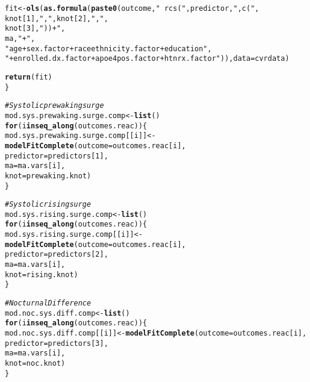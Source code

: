 \documentclass[10pt]{article}\usepackage[]{graphicx}\usepackage[]{color}
\makeatletter
\newcommand{\hlnum}[1]{\textcolor[rgb]{0.686,0.059,0.569}{#1}}%
\newcommand{\hlstr}[1]{\textcolor[rgb]{0.192,0.494,0.8}{#1}}%
\newcommand{\hlcom}[1]{\textcolor[rgb]{0.678,0.584,0.686}{\textit{#1}}}%
\newcommand{\hlstd}[1]{\textcolor[rgb]{0.345,0.345,0.345}{#1}}%
\newcommand{\hlkwa}[1]{\textcolor[rgb]{0.161,0.373,0.58}{\textbf{#1}}}%
\newcommand{\hlkwb}[1]{\textcolor[rgb]{0.69,0.353,0.396}{#1}}%
\newcommand{\hlkwc}[1]{\textcolor[rgb]{0.333,0.667,0.333}{#1}}%
\newcommand{\hlkwd}[1]{\textcolor[rgb]{0.737,0.353,0.396}{\textbf{#1}}}%
\newenvironment{kframe}{%
 \def\at@end@of@kframe{}%
 \ifinner\ifhmode%
  \def\at@end@of@kframe{\end{minipage}}%
  \begin{minipage}{\columnwidth}%
 \fi\fi%
 \def\FrameCommand##1{\hskip\@totalleftmargin \hskip-\fboxsep
 \colorbox{shadecolor}{##1}\hskip-\fboxsep
     \hskip-\linewidth \hskip-\@totalleftmargin \hskip\columnwidth}%
 \MakeFramed {\advance\hsize-\width
   \@totalleftmargin\z@ \linewidth\hsize
   \@setminipage}}%
 {\par\unskip\endMakeFramed%
 \at@end@of@kframe}
\newenvironment{knitrout}{}{} %
\makeatother
\begin{document}
\begin{knitrout}
\begin{kframe}
\begin{alltt}
  \hlstd{fit} \hlkwb{<-} \hlkwd{ols}\hlstd{(}\hlkwd{as.formula}\hlstd{(}\hlkwd{paste0}\hlstd{(outcome,} \hlstr{"~ rcs("}\hlstd{, predictor,} \hlstr{", c("}\hlstd{,}
                                           \hlstd{knot[}\hlnum{1}\hlstd{],}\hlstr{","}\hlstd{, knot[}\hlnum{2}\hlstd{],}\hlstr{","}\hlstd{,}
                                           \hlstd{knot[}\hlnum{3}\hlstd{],}\hlstr{")) +"}\hlstd{,}
                                           \hlstd{ma,} \hlstr{"+"}\hlstd{,}
\hlstr{"age + sex.factor + raceethnicity.factor + education"}\hlstd{,}
\hlstr{"+ enrolled.dx.factor + apoe4pos.factor + htnrx.factor"}\hlstd{)),} \hlkwc{data} \hlstd{= cvrdata)}

  \hlkwd{return}\hlstd{(fit)}
\hlstd{\}}


\hlcom{#Systolic prewaking surge}
\hlstd{mod.sys.prewaking.surge.comp} \hlkwb{<-} \hlkwd{list}\hlstd{()}
\hlkwa{for}\hlstd{(i} \hlkwa{in} \hlkwd{seq_along}\hlstd{(outcomes.reac))\{}
  \hlstd{mod.sys.prewaking.surge.comp[[i]]} \hlkwb{<-} \hlkwd{modelFitComplete}\hlstd{(}\hlkwc{outcome} \hlstd{= outcomes.reac[i],}
                                                   \hlkwc{predictor} \hlstd{= predictors[}\hlnum{1}\hlstd{],}
                                                   \hlkwc{ma} \hlstd{= ma.vars[i],}
                                                   \hlkwc{knot} \hlstd{= prewaking.knot)}
\hlstd{\}}

\hlcom{#Systolic rising surge}
\hlstd{mod.sys.rising.surge.comp} \hlkwb{<-} \hlkwd{list}\hlstd{()}
\hlkwa{for}\hlstd{(i} \hlkwa{in} \hlkwd{seq_along}\hlstd{(outcomes.reac))\{}
  \hlstd{mod.sys.rising.surge.comp[[i]]} \hlkwb{<-} \hlkwd{modelFitComplete}\hlstd{(}\hlkwc{outcome} \hlstd{= outcomes.reac[i],}
                                                   \hlkwc{predictor} \hlstd{= predictors[}\hlnum{2}\hlstd{],}
                                                   \hlkwc{ma} \hlstd{= ma.vars[i],}
                                                   \hlkwc{knot} \hlstd{= rising.knot)}
\hlstd{\}}

\hlcom{#Nocturnal Difference}
\hlstd{mod.noc.sys.diff.comp} \hlkwb{<-} \hlkwd{list}\hlstd{()}
\hlkwa{for}\hlstd{(i} \hlkwa{in} \hlkwd{seq_along}\hlstd{(outcomes.reac))\{}
  \hlstd{mod.noc.sys.diff.comp[[i]]} \hlkwb{<-} \hlkwd{modelFitComplete}\hlstd{(}\hlkwc{outcome} \hlstd{= outcomes.reac[i],}
                                                   \hlkwc{predictor} \hlstd{= predictors[}\hlnum{3}\hlstd{],}
                                                   \hlkwc{ma} \hlstd{= ma.vars[i],}
                                                   \hlkwc{knot} \hlstd{= noc.knot)}
\hlstd{\}}


\end{alltt}
\end{kframe}
\end{knitrout}
\end{document}

